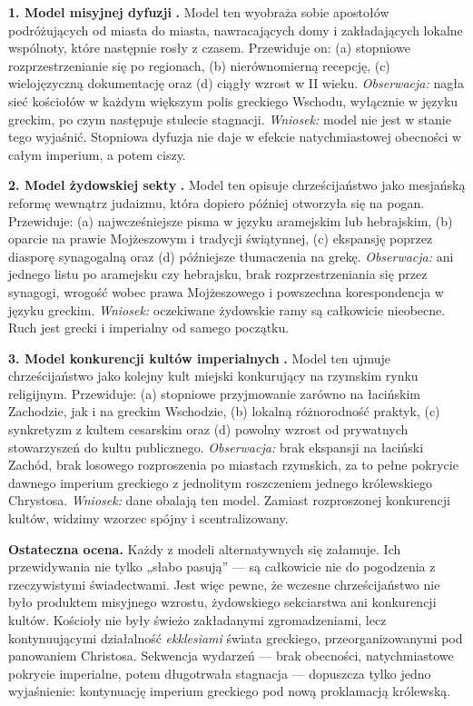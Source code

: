 \textbf{1. Model misyjnej dyfuzji} \cite{harnack:mission,stark:rise}\textbf{.}
Model ten wyobraża sobie apostołów podróżujących od miasta do miasta, nawracających domy i zakładających lokalne wspólnoty, które następnie rosły z czasem.
Przewiduje on: (a) stopniowe rozprzestrzenianie się po regionach, (b) nierównomierną recepcję, (c) wielojęzyczną dokumentację oraz (d) ciągły wzrost w II wieku.
\emph{Obserwacja:} nagła sieć kościołów w każdym większym polis greckiego Wschodu, wyłącznie w języku greckim, po czym następuje stulecie stagnacji.
\emph{Wniosek:} model nie jest w stanie tego wyjaśnić.
Stopniowa dyfuzja nie daje w efekcie natychmiastowej obecności w całym imperium, a potem ciszy.

\textbf{2. Model żydowskiej sekty} \cite{eisenman:james,sanders:jesus,vermes:jesus}\textbf{.}
Model ten opisuje chrześcijaństwo jako mesjańską reformę wewnątrz judaizmu, która dopiero później otworzyła się na pogan.
Przewiduje: (a) najwcześniejsze pisma w języku aramejskim lub hebrajskim, (b) oparcie na prawie Mojżeszowym i tradycji świątynnej, (c) ekspansję poprzez diasporę synagogalną oraz (d) późniejsze tłumaczenia na grekę.
\emph{Obserwacja:} ani jednego listu po aramejsku czy hebrajsku, brak rozprzestrzeniania się przez synagogi, wrogość wobec prawa Mojżeszowego i powszechna korespondencja w języku greckim.
\emph{Wniosek:} oczekiwane żydowskie ramy są całkowicie nieobecne.
Ruch jest grecki i imperialny od samego początku.

\textbf{3. Model konkurencji kultów imperialnych} \cite{friesen:imperial,harland:associations}\textbf{.}
Model ten ujmuje chrześcijaństwo jako kolejny kult miejski konkurujący na rzymskim rynku religijnym.
Przewiduje: (a) stopniowe przyjmowanie zarówno na łacińskim Zachodzie, jak i na greckim Wschodzie, (b) lokalną różnorodność praktyk, (c) synkretyzm z kultem cesarskim oraz (d) powolny wzrost od prywatnych stowarzyszeń do kultu publicznego.
\emph{Obserwacja:} brak ekspansji na łaciński Zachód, brak losowego rozproszenia po miastach rzymskich, za to pełne pokrycie dawnego imperium greckiego z jednolitym roszczeniem jednego królewskiego Chrystosa.
\emph{Wniosek:} dane obalają ten model.
Zamiast rozproszonej konkurencji kultów, widzimy wzorzec spójny i scentralizowany.

\textbf{Ostateczna ocena.}
Każdy z modeli alternatywnych się załamuje.
Ich przewidywania nie tylko „słabo pasują” — są całkowicie nie do pogodzenia z rzeczywistymi świadectwami.
Jest więc pewne, że wczesne chrześcijaństwo nie było produktem misyjnego wzrostu, żydowskiego sekciarstwa ani konkurencji kultów.
Kościoły nie były świeżo zakładanymi zgromadzeniami, lecz kontynuującymi działalność \textit{ekklesiami} świata greckiego, przeorganizowanymi pod panowaniem Christosa.
Sekwencja wydarzeń — brak obecności, natychmiastowe pokrycie imperialne, potem długotrwała stagnacja — dopuszcza tylko jedno wyjaśnienie: kontynuację imperium greckiego pod nową proklamacją królewską.

